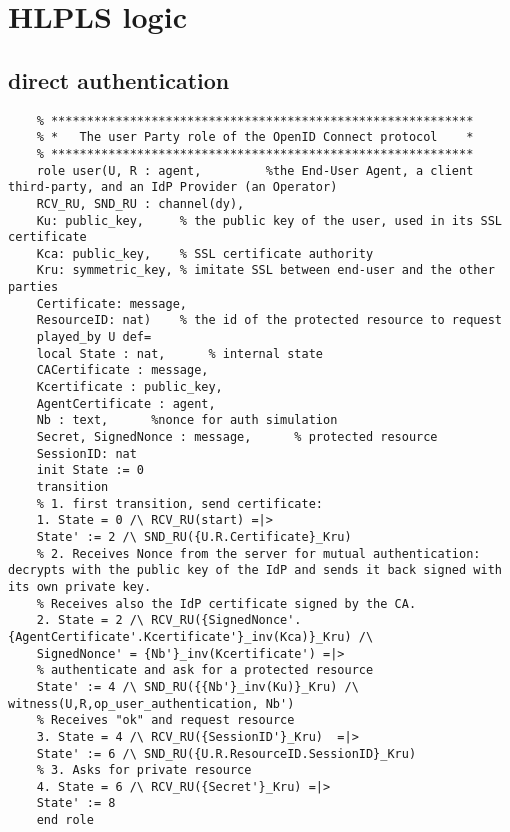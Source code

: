 \chapter{HLPLS logic}
\label{appendix:hlpls}

\section{direct authentication}

	\lstset{language=HLPSL}
	\begin{lstlisting}
	% ***********************************************************
	% *   The user Party role of the OpenID Connect protocol    *
	% ***********************************************************
	role user(U, R : agent, 		%the End-User Agent, a client third-party, and an IdP Provider (an Operator)
	RCV_RU, SND_RU : channel(dy),
	Ku: public_key,		% the public key of the user, used in its SSL certificate
	Kca: public_key, 	% SSL certificate authority
	Kru: symmetric_key, % imitate SSL between end-user and the other parties
	Certificate: message,
	ResourceID: nat)	% the id of the protected resource to request
	played_by U	def=
	local State : nat, 		% internal state 
	CACertificate : message,
	Kcertificate : public_key,
	AgentCertificate : agent,
	Nb : text, 		%nonce for auth simulation
	Secret, SignedNonce : message,		% protected resource
	SessionID: nat
	init State := 0
	transition
	% 1. first transition, send certificate:
	1. State = 0 /\ RCV_RU(start) =|>
	State' := 2 /\ SND_RU({U.R.Certificate}_Kru)
	% 2. Receives Nonce from the server for mutual authentication: decrypts with the public key of the IdP and sends it back signed with its own private key.
	% Receives also the IdP certificate signed by the CA.
	2. State = 2 /\ RCV_RU({SignedNonce'.{AgentCertificate'.Kcertificate'}_inv(Kca)}_Kru) /\ 
	SignedNonce' = {Nb'}_inv(Kcertificate') =|>
	% authenticate and ask for a protected resource
	State' := 4 /\ SND_RU({{Nb'}_inv(Ku)}_Kru) /\ witness(U,R,op_user_authentication, Nb')
	% Receives "ok" and request resource
	3. State = 4 /\ RCV_RU({SessionID'}_Kru)  =|>
	State' := 6 /\ SND_RU({U.R.ResourceID.SessionID}_Kru)
	% 3. Asks for private resource
	4. State = 6 /\ RCV_RU({Secret'}_Kru) =|>
	State' := 8
	end role
	

\end{lstlisting}
